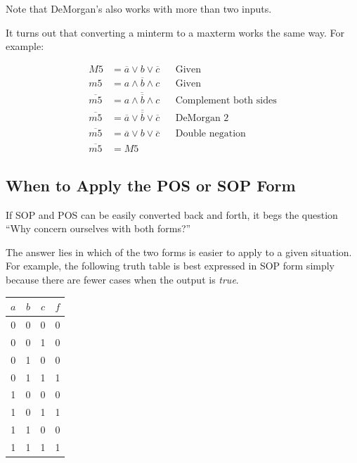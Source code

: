 \documentclass[10pt]{article}
\begin{document}
Note that DeMorgan's also works with more than two inputs.

It turns out that converting a minterm to a maxterm works the same way. 
For example:

\begin{align}
M5 & = \overline{a} \lor b \lor \overline{c}	&& \text{Given}		\\
m5 &= a \land \overline{b} \land c		&& \text{Given}		\\
\overline{m5} &= \overline{a \land \overline{b} \land c}	&& \text{Complement both sides} \\
\overline{m5} &= \overline{a} \lor \overline{\overline{b}} \lor \overline{c}	&& \text{DeMorgan 2} \\
\overline{m5} &= \overline{a} \lor b \lor \overline{c}			&& \text{Double negation} \\
\overline{m5} &= M5
\end{align}

\subsection{When to Apply the POS or SOP Form}

If SOP and POS can be easily converted back and forth, it begs the question
``Why concern ourselves with both forms?''

The answer lies in which of the two forms is easier to apply to a given
situation.  For example, the following truth table is best expressed in SOP 
form simply because there are fewer cases when the output is {\em true}. 

\begin{center}
\begin{tabular}{|ccc|c|}
$a$ & $b$ & $c$ & $f$ \\
\hline
 0 & 0 & 0 &   0\\
 0 & 0 & 1 &   0\\
 0 & 1 & 0 &   0\\
 0 & 1 & 1 &   1\\
 1 & 0 & 0 &   0\\
 1 & 0 & 1 &   1\\
 1 & 1 & 0 &   0\\
 1 & 1 & 1 &   1\\
\hline
\end{tabular}
\end{center}
\end{document}
